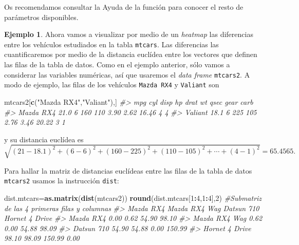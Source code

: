 \documentclass[
]{book}
\newenvironment{Shaded}{\begin{snugshade}}{\end{snugshade}}
\newcommand{\CommentTok}[1]{\textcolor[rgb]{0.56,0.35,0.01}{\textit{#1}}}
\newcommand{\DecValTok}[1]{\textcolor[rgb]{0.00,0.00,0.81}{#1}}
\newcommand{\KeywordTok}[1]{\textcolor[rgb]{0.13,0.29,0.53}{\textbf{#1}}}
\newcommand{\NormalTok}[1]{#1}
\newcommand{\OperatorTok}[1]{\textcolor[rgb]{0.81,0.36,0.00}{\textbf{#1}}}
\newcommand{\StringTok}[1]{\textcolor[rgb]{0.31,0.60,0.02}{#1}}
\theoremstyle{definition}
\theoremstyle{definition}
\newtheorem{example}{Ejemplo}[chapter]
\theoremstyle{definition}
\theoremstyle{remark}
\begin{document}
Os recomendamos consultar la Ayuda de la función para conocer el resto de parámetros disponibles.

\begin{example}
\protect\hypertarget{exm:VEHICLES}{}{\label{exm:VEHICLES} }Ahora vamos a visualizar por medio de un \emph{heatmap} las diferencias entre los vehículos estudiados en la tabla \texttt{mtcars}. Las diferencias las cuantificaremos por medio de la distancia euclídea entre los vectores que definen las filas de la tabla de datos. Como en el ejemplo anterior, sólo vamos a considerar las variables numéricas, así que usaremos el \emph{data frame} \texttt{mtcars2}. A modo de ejemplo, las filas de los vehículos \texttt{Mazda\ RX4} y \texttt{Valiant} son
\end{example}

\begin{Shaded}
\begin{Highlighting}[]
\NormalTok{mtcars2[}\KeywordTok{c}\NormalTok{(}\StringTok{"Mazda RX4"}\NormalTok{,}\StringTok{"Valiant"}\NormalTok{),]}
\CommentTok{\#\textgreater{}            mpg cyl disp  hp drat   wt  qsec gear carb}
\CommentTok{\#\textgreater{} Mazda RX4 21.0   6  160 110 3.90 2.62 16.46    4    4}
\CommentTok{\#\textgreater{} Valiant   18.1   6  225 105 2.76 3.46 20.22    3    1}
\end{Highlighting}
\end{Shaded}

y su distancia euclídea es
\[
\sqrt{(21-18.1)^2+(6-6)^2+(160-225)^2+(110-105)^2+\cdots +(4-1)^2}=65.4565.
\]

Para hallar la matriz de distancias euclídeas entre las filas de la tabla de datos \texttt{mtcars2} usamos la instrucción \texttt{dist}:

\begin{Shaded}
\begin{Highlighting}[]
\NormalTok{dist.mtcars=}\KeywordTok{as.matrix}\NormalTok{(}\KeywordTok{dist}\NormalTok{(mtcars2)) }
\KeywordTok{round}\NormalTok{(dist.mtcars[}\DecValTok{1}\OperatorTok{:}\DecValTok{4}\NormalTok{,}\DecValTok{1}\OperatorTok{:}\DecValTok{4}\NormalTok{],}\DecValTok{2}\NormalTok{) }\CommentTok{\#Submatriz de las 4 primeras filas y columnas}
\CommentTok{\#\textgreater{}                Mazda RX4 Mazda RX4 Wag Datsun 710 Hornet 4 Drive}
\CommentTok{\#\textgreater{} Mazda RX4           0.00          0.62      54.90          98.10}
\CommentTok{\#\textgreater{} Mazda RX4 Wag       0.62          0.00      54.88          98.09}
\CommentTok{\#\textgreater{} Datsun 710         54.90         54.88       0.00         150.99}
\CommentTok{\#\textgreater{} Hornet 4 Drive     98.10         98.09     150.99           0.00}
\end{Highlighting}
\end{Shaded}
\end{document}

